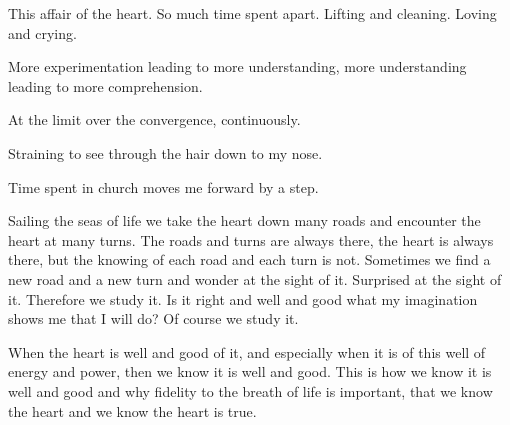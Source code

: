 \break

This affair of the heart.  So much time spent apart.  Lifting and
cleaning.  Loving and crying.    

More experimentation leading to more understanding, more understanding
leading to more comprehension.

At the limit over the convergence, continuously.

\break

Straining to see through the hair down to my nose.

\break

Time spent in church moves me forward by a step.

\break

Sailing the seas of life we take the heart down many roads and
encounter the heart at many turns.  The roads and turns are always
there, the heart is always there, but the knowing of each road and
each turn is not.  Sometimes we find a new road and a new turn and
wonder at the sight of it.  Surprised at the sight of it.  Therefore
we study it.  Is it right and well and good what my imagination shows
me that I will do?  Of course we study it.  

When the heart is well and good of it, and especially when it is of
this well of energy and power, then we know it is well and good.  This
is how we know it is well and good and why fidelity to the breath of
life is important, that we know the heart and we know the heart is
true.

\bye
